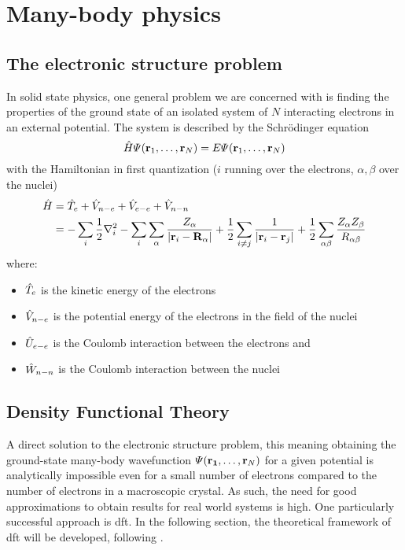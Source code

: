 \documentclass[main.tex]{subfiles}
\begin{document}
\chapter{Many-body physics\label{chap:many-body-physics}}

\section{The electronic structure problem\label{sec:theory_schrödinger}}

In solid state physics, one general problem we are concerned with is finding the properties of the ground state of an isolated system of \(N\) interacting electrons in an external potential.
The system is described by the Schrödinger equation
\begin{equation}
    \hat{H} \Psi (\vb{r}_1, \ldots, \vb{r}_N) = E \Psi (\vb{r}_1, \ldots, \vb{r}_N)
\end{equation}
with the Hamiltonian in first quantization (\(i\) running over the electrons, \(\alpha, \beta\) over the nuclei)
\begin{align}
    \hat{H} &= \hat{T}_e + \hat{V}_{n-e} + \hat{V}_{e-e} + \hat{V}_{n-n} \\
    &= -\sum_i \frac{1}{2} \nabla^2_i - \sum_i \sum_{\alpha} \frac{Z_{\alpha}}{\vert \vb{r}_i - \vb{R}_{\alpha} \vert} + \frac{1}{2} \sum_{i \neq j} \frac{1}{\vert \vb{r}_i - \vb{r}_j \vert} + \frac{1}{2} \sum_{\alpha \beta} \frac{Z_{\alpha} Z_{\beta}}{R_{\alpha \beta}}
\end{align}
where:
\begin{itemize}
    \item \(\hat{T}_e\) is the kinetic energy of the electrons
    \item \(\hat{V}_{n-e}\) is the potential energy of the electrons in the field of the nuclei
    \item \(\hat{U}_{e-e}\) is the Coulomb interaction between the electrons and
    \item \(\hat{W}_{n-n}\) is the Coulomb interaction between the nuclei
\end{itemize}

\section{Density Functional Theory\label{sec:theory_dft}}

A direct solution to the electronic structure problem, this meaning obtaining the ground-state many-body wavefunction \(\Psi (\vb{r_1}, \ldots, \vb{r}_N)\) for a given potential is analytically impossible even for a small number of electrons compared to the number of electrons in a macroscopic crystal.
As such, the need for good approximations to obtain results for real world
systems is high.
One particularly successful approach is \acrfull{dft}.
In the following section, the theoretical framework of \acrshort{dft} will be developed, following \cite{marzari_ab-initio_1996}.
\end{document}
